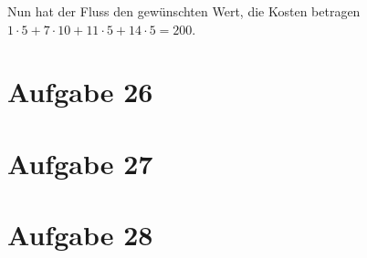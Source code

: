 \documentclass[a4paper,12pt,german]{scrartcl}
\begin{document}
 Nun hat der Fluss den gewünschten Wert, die Kosten betragen $1\cdot 5+7\cdot 10+11\cdot 5+14\cdot 5=200$.
 \section*{Aufgabe 26}
\section*{Aufgabe 27}
\section*{Aufgabe 28}
\end{document}
